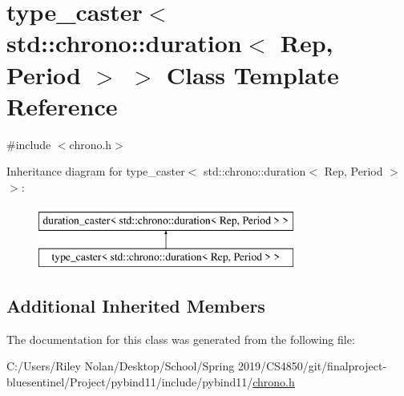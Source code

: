 \hypertarget{classtype__caster_3_01std_1_1chrono_1_1duration_3_01_rep_00_01_period_01_4_01_4}{}\section{type\+\_\+caster$<$ std\+::chrono\+::duration$<$ Rep, Period $>$ $>$ Class Template Reference}
\label{classtype__caster_3_01std_1_1chrono_1_1duration_3_01_rep_00_01_period_01_4_01_4}


{\ttfamily \#include $<$chrono.\+h$>$}

Inheritance diagram for type\+\_\+caster$<$ std\+::chrono\+::duration$<$ Rep, Period $>$ $>$\+:\begin{figure}[H]
\begin{center}
\leavevmode
\includegraphics[height=2.000000cm]{classtype__caster_3_01std_1_1chrono_1_1duration_3_01_rep_00_01_period_01_4_01_4}
\end{center}
\end{figure}
\subsection*{Additional Inherited Members}


The documentation for this class was generated from the following file\+:\begin{DoxyCompactItemize}
\item 
C\+:/\+Users/\+Riley Nolan/\+Desktop/\+School/\+Spring 2019/\+C\+S4850/git/finalproject-\/bluesentinel/\+Project/pybind11/include/pybind11/\mbox{\hyperlink{chrono_8h}{chrono.\+h}}\end{DoxyCompactItemize}
